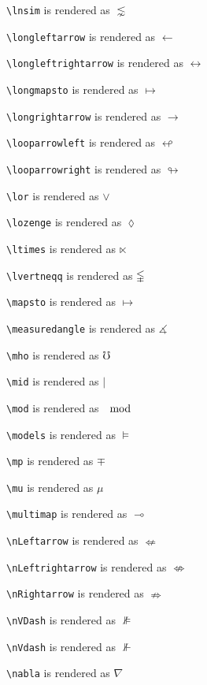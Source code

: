 \texttt{\textbackslash lnsim} is rendered as $\lnsim$

\texttt{\textbackslash longleftarrow} is rendered as $\longleftarrow$

\texttt{\textbackslash longleftrightarrow} is rendered as $\longleftrightarrow$

\texttt{\textbackslash longmapsto} is rendered as $\longmapsto$

\texttt{\textbackslash longrightarrow} is rendered as $\longrightarrow$

\texttt{\textbackslash looparrowleft} is rendered as $\looparrowleft$

\texttt{\textbackslash looparrowright} is rendered as $\looparrowright$

\texttt{\textbackslash lor} is rendered as $\lor$

\texttt{\textbackslash lozenge} is rendered as $\lozenge$

\texttt{\textbackslash ltimes} is rendered as $\ltimes$

\texttt{\textbackslash lvertneqq} is rendered as $\lvertneqq$

\texttt{\textbackslash mapsto} is rendered as $\mapsto$

\texttt{\textbackslash measuredangle} is rendered as $\measuredangle$

\texttt{\textbackslash mho} is rendered as $\mho$

\texttt{\textbackslash mid} is rendered as $\mid$

\texttt{\textbackslash mod} is rendered as $\mod$

\texttt{\textbackslash models} is rendered as $\models$

\texttt{\textbackslash mp} is rendered as $\mp$

\texttt{\textbackslash mu} is rendered as $\mu$

\texttt{\textbackslash multimap} is rendered as $\multimap$

\texttt{\textbackslash nLeftarrow} is rendered as $\nLeftarrow$

\texttt{\textbackslash nLeftrightarrow} is rendered as $\nLeftrightarrow$

\texttt{\textbackslash nRightarrow} is rendered as $\nRightarrow$

\texttt{\textbackslash nVDash} is rendered as $\nVDash$

\texttt{\textbackslash nVdash} is rendered as $\nVdash$

\texttt{\textbackslash nabla} is rendered as $\nabla$

